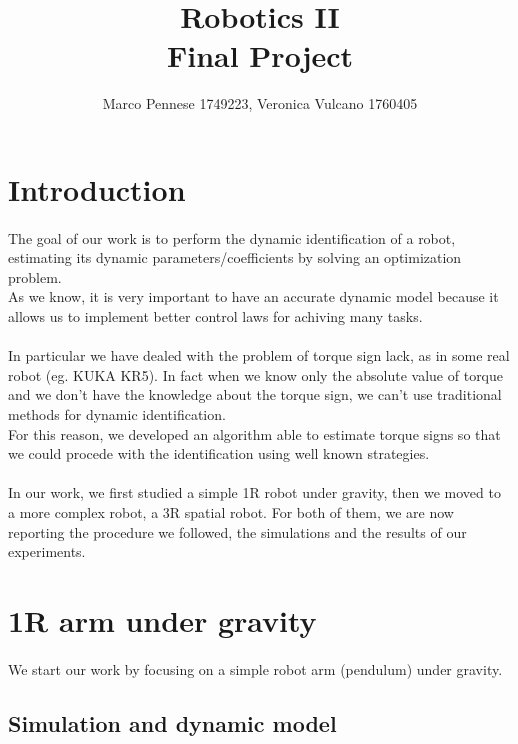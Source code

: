 \documentclass{article}
\title{\textbf{Robotics II} \\ \large{\textbf{Final Project}}}
\author{Marco Pennese 1749223, Veronica Vulcano 1760405}
\date{}
\begin{document}
\maketitle
\tableofcontents
\pagebreak

\section{Introduction}
\paragraph{}The goal of our work is to perform the dynamic identification of a robot, estimating its dynamic parameters/coefficients by solving an optimization problem.\\
As we know, it is very important to have an accurate dynamic model because it allows us to implement better control laws for achiving many tasks.\\\\
In particular we have dealed with the problem of torque sign lack, as in some real robot (eg. KUKA KR5). In fact when we know only the absolute value of torque and we don't have the knowledge about the torque sign, we can't use traditional methods for dynamic identification.\\
For this reason, we developed an algorithm able to estimate torque signs so that we could procede with the identification using well known strategies.\\\\
In our work, we first studied a simple 1R robot under gravity, then we moved to a more complex robot, a 3R spatial robot. For both of them, we are now reporting the procedure we followed, the simulations and the results of our experiments.
\section{1R arm under gravity}
\paragraph{}We start our work by focusing on a simple robot arm (pendulum) under gravity.
\subsection{Simulation and dynamic model}
\end{document}
